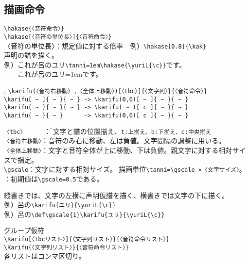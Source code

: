 \documentclass[a4paper,luatex]{l3doc}
\begin{document}
\subsection{描画命令}
\begin{function}{\hakase}
 \verb|\hakase{〈音符命令〉}|\\
 \verb|\hakase[〈音符の単位長〉]{〈音符命令〉}|\\
〈音符の単位長〉：規定値に対する倍率　例）\verb|\hakase[0.8]{\kak}|\\
 声明の譜を描く。\\
例）これが呂のユリ\verb|\tanni=1em\hakase{\yuriL{\c}}|です。\\
　　これが呂のユリ\tanni=1em\hakase{\yuriL{\c}}です。
\end{function}
\begin{function}{\karifu,\gscale}
 \verb|\karifu(〈音符右移動〉,〈全体上移動〉)[〈tbc〉]{〈文字列〉}{〈音符命令〉}|\\
 \verb|\karifu[ ~ ]{ ~ }{ ~ } -> \karifu(0,0)[ ~ ]{ ~ }{ ~ }|\\
 \verb|\karifu( ~ ){ ~ }{ ~ } -> \karifu( ~ )[ c ]{ ~ }{ ~ }|\\
 \verb|\karifu{ ~ }{ ~ }      -> \karifu(0,0)[ c ]{ ~ }{ ~ }|
\begin{tabbing}
 \verb|〈tbc〉　　　 |\=： 文字と譜の位置揃え、\verb|t:上揃え、b:下揃え、c:中央揃え|\\
 \verb|〈音符右移動〉|\>：音符のみ右に移動、左は負値。文字間隔の調整に用いる。\\
 \verb|〈全体上移動〉|\>：文字と音符全体が上に移動、下は負値。親文字に対する相対サイズで指定。\\
 \verb|\gscale|\>：文字に対する相対サイズ。
 描画単位\verb|\tanni=\gscale ×〈文字サイズ〉|。\\
 \>：初期値は\verb|\gscale=0.5|である。
\end{tabbing}
 縦書きでは、文字の左横に声明仮譜を描く、横書きでは文字の下に描く。\\
例）呂の\verb|\karifu{ユリ}{\yuriL{\c}}|
\hspace{2em}\\
例）呂の\verb|\def\gscale{1}\karifu{ユリ}{\yuriL{\c}}|
\hspace{2em}
\end{function}
\begin{function}{\Karifu}
グループ仮符\\
 \verb|\Karifu[〈tbcリスト〉]{〈文字列リスト〉}{〈音符命令リスト〉}|\\
 \verb|\Karifu{〈文字列リスト〉}{〈音符命令リスト〉}|\\
各リストはコンマ区切り。
\end{function}
\end{document}
